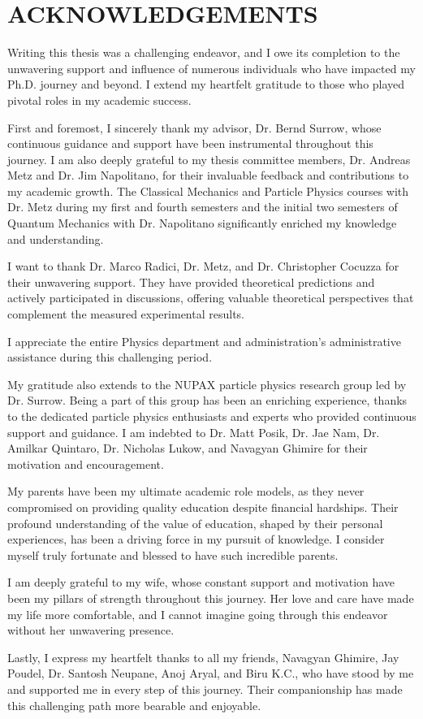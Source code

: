\chapter*{ACKNOWLEDGEMENTS}

Writing this thesis was a challenging endeavor, and I owe its completion to the unwavering support and influence of numerous individuals who have impacted my Ph.D. journey and beyond. I extend my heartfelt gratitude to those who played pivotal roles in my academic success.

First and foremost, I sincerely thank my advisor, Dr. Bernd Surrow, whose continuous guidance and support have been instrumental throughout this journey. I am also deeply grateful to my thesis committee members, Dr. Andreas Metz and Dr. Jim Napolitano, for their invaluable feedback and contributions to my academic growth. The Classical Mechanics and Particle Physics courses with Dr. Metz during my first and fourth semesters and the initial two semesters of Quantum Mechanics with Dr. Napolitano significantly enriched my knowledge and understanding.

I want to thank Dr. Marco Radici, Dr. Metz, and Dr. Christopher Cocuzza for their unwavering support. They have provided theoretical predictions and actively participated in discussions, offering valuable theoretical perspectives that complement the measured experimental results. 

I appreciate the entire Physics department and administration's administrative assistance during this challenging period.

My gratitude also extends to the NUPAX particle physics research group led by Dr. Surrow. Being a part of this group has been an enriching experience, thanks to the dedicated particle physics enthusiasts and experts who provided continuous support and guidance. I am indebted to Dr. Matt Posik, Dr. Jae Nam, Dr. Amilkar Quintaro, Dr. Nicholas Lukow, and Navagyan Ghimire for their motivation and encouragement.

My parents have been my ultimate academic role models, as they never compromised on providing quality education despite financial hardships. Their profound understanding of the value of education, shaped by their personal experiences, has been a driving force in my pursuit of knowledge. I consider myself truly fortunate and blessed to have such incredible parents.

I am deeply grateful to my wife, whose constant support and motivation have been my pillars of strength throughout this journey. Her love and care have made my life more comfortable, and I cannot imagine going through this endeavor without her unwavering presence.

Lastly, I express my heartfelt thanks to all my friends, Navagyan Ghimire, Jay Poudel, Dr. Santosh Neupane, Anoj Aryal, and Biru K.C., who have stood by me and supported me in every step of this journey. Their companionship has made this challenging path more bearable and enjoyable.







